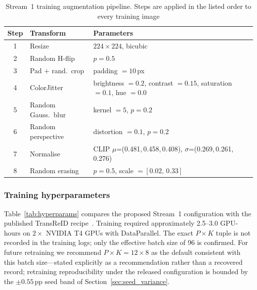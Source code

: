 \documentclass[10pt,a4paper]{article}
\begin{document}
\begin{table}[!t]
  \centering
  \caption{Stream~1 training augmentation pipeline. Steps are applied in the
  listed order to every training image}
  \label{tab:augmentation}
  \small
  \begin{tabular}{clL{8.4cm}}
    \toprule
    Step & Transform & Parameters \\
     & Resize              & $224\times224$, bicubic \\
    2 & Random H-flip       & $p=0.5$ \\
    3 & Pad $+$ rand.\ crop & padding $=10$\,px \\
    4 & ColorJitter         & brightness $=0.2$, contrast $=0.15$,
                              saturation $=0.1$, hue $=0.0$ \\
    5 & Random Gauss.\ blur & kernel $=5$, $p=0.2$ \\
    6 & Random perspective  & distortion $=0.1$, $p=0.2$ \\
    7 & Normalise           & CLIP $\mu$=(0.481,\,0.458,\,0.408),
                              $\sigma$=(0.269,\,0.261,\,0.276)~\cite{radford2021clip} \\
    8 & Random erasing      & $p=0.5$, scale $=[0.02,\,0.33]$ \\
    \bottomrule
  \end{tabular}
\end{table}

\subsubsection{Training hyperparameters}
Table~\ref{tab:hyperparams} compares the proposed Stream~1 configuration with
the published TransReID recipe~\cite{he2021transreid}. Training required
approximately 2.5--3.0 GPU-hours on $2\times$ NVIDIA T4 GPUs with DataParallel.
The exact $P{\times}K$ tuple is not recorded in the training logs; only the
effective batch size of 96 is confirmed. For future retraining we recommend
$P{\times}K = 12{\times}8$ as the default consistent with this batch
size---stated explicitly as a recommendation rather than a recovered record;
retraining reproducibility under the released configuration is bounded by the
$\pm 0.55$\,pp seed band of Section~\ref{sec:seed_variance}.
\end{document}
